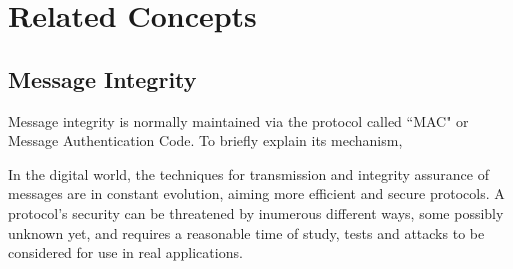 \documentclass[12pt]{article}
\begin{document}
\iffalse
The most common cryptographic uses of hash functions are with digital signatures and
for data integrity.  With digital signatures, a long message is usually hashed (using a publicly 
available hash function) and only the hash-value is signed.  The party receiving the
message then hashes the received message, and verifies that the received signature is correct 
for this hash-value. This saves both time and space compared to signing the message
directly, which would typically involve splitting the message into appropriate-sized blocks
and signing each block individually. Note here that the inability to find two messages with
the same hash-value is a security requirement, since otherwise, the signature on one mes-
sage hash-value would be the same as that on another, allowing a signer to sign one message
and at a later point in time claim to have signed another \cite{menezes1996handbook}.
Hash functions may be used for data integrity as follows. The hash-value corresponding to a particular 
input is computed at some point in time. The integrity of this hash-value is protected in some manner. 
At a subsequent point in time, to verify that the input data has not been altered, the hash-value is 
recomputed using the input at hand, and compared for equality with the original hash-value. Specific 
applications include virus protection and software distribution \cite{menezes1996handbook}.
\fi

\section{Related Concepts} 

\iffalse
\subsection{Message Integrity}

Message integrity is normally maintained via the protocol called “MAC" or Message Authentication Code. 
To briefly explain its mechanism,

In the digital world, the techniques for transmission and integrity assurance of messages are in constant
evolution, aiming more efficient and secure protocols. A protocol's security can be threatened by inumerous
different ways, some possibly unknown yet, and requires a reasonable time of study, tests and attacks
to be considered for use in real applications.
\end{document}
